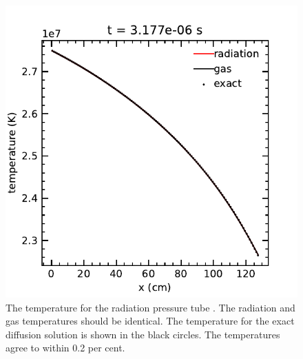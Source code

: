 \documentclass[fleqn,usenatbib]{mnras}
\begin{document}
\begin{figure}
    \includegraphics[width=\columnwidth]{radiation_pressure_tube.pdf}
    \caption{The temperature for the radiation pressure tube \citep{Krumholz_2007}. The radiation and gas temperatures should be identical. The temperature for the exact diffusion solution is shown in the black circles. The temperatures agree to within 0.2 per cent.}
    \label{fig:radiation_pressure_tube}
\end{figure}
\end{document}
